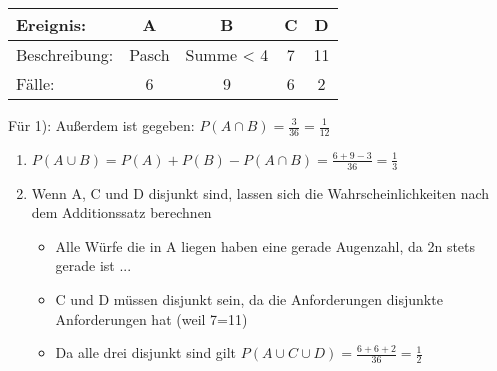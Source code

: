 \begin{tabular}{|l|c|c|c|c|}
	\hline
	Ereignis: & A & B & C & D \\
	\hline
	Beschreibung: & Pasch & Summe < 4 & 7 & 11 \\
	\hline
	Fälle: & 6 & 9 & 6 & 2 \\
	\hline
\end{tabular} 

Für 1): Außerdem ist gegeben: $ P(A \cap B ) = \frac{3}{36} = \frac{1}{12} $

\begin{enumerate}
	\item $P(A \cup B) = P(A) + P(B) - P(A \cap B) = \frac{6+9-3}{36}=\frac{1}{3}$
	\item Wenn A, C und D disjunkt sind, lassen sich die Wahrscheinlichkeiten nach dem Additionssatz berechnen
	\begin{itemize}
		\item Alle Würfe die in A liegen haben eine gerade Augenzahl, da 2n stets gerade ist ...
		\item C und D müssen disjunkt sein, da die Anforderungen disjunkte Anforderungen hat (weil 7=11)
		\item Da alle drei disjunkt sind gilt $P(A \cup C \cup D) = \frac{6+6+2}{36} = \frac{1}{2}$
	\end{itemize}
\end{enumerate}
